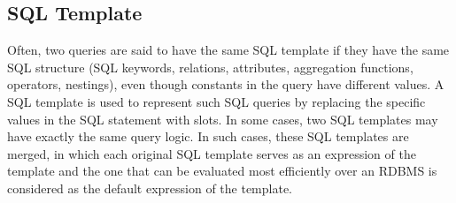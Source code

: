 \documentclass{vldb}
\begin{document}
\subsection{SQL Template}
\label{subsec:SQLTemplate}
Often, two queries are said to have the same SQL template if they have the same SQL structure (SQL keywords, relations, attributes, aggregation functions, operators, nestings), even though constants in the query have different values.  A SQL template is used to represent such SQL queries by replacing the specific values in the SQL statement with slots.  In some cases, two SQL templates may have exactly the same query logic.  In such cases, these SQL templates are merged, in which each original SQL template serves as an expression of the template and the one that can be evaluated most efficiently over an RDBMS is considered as the default expression of the template.  
\end{document}
